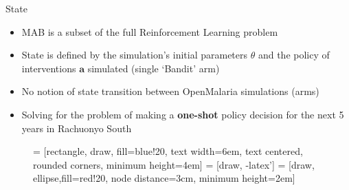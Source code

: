 \documentclass{beamer}
\begin{document}
\begin{frame}{State}

\begin{itemize}
\item MAB is a subset of the full Reinforcement Learning problem
\item State is defined by the simulation's initial parameters $\theta$ and the policy of interventions $\bm{a}$ simulated (single `Bandit' arm)
\item No notion of state transition between OpenMalaria simulations (arms)
\item Solving for the problem of making a \textbf{one-shot} policy decision for the next 5 years in Rachuonyo South

\end{itemize}

\begin{figure}[!t]
\centering
{} = [rectangle, draw, fill=blue!20, 
    text width=6em, text centered, rounded corners, minimum height=4em]
 = [draw, -latex']
 = [draw, ellipse,fill=red!20, node distance=3cm,
    minimum height=2em]
    
\label{fig_flow}
\end{figure}



\end{frame}
\end{document}
